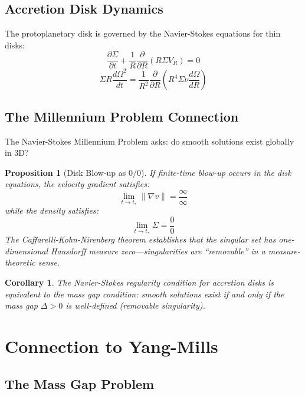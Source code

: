 \documentclass[12pt]{article}
\newtheorem{corollary}[theorem]{Corollary}
\newtheorem{proposition}[theorem]{Proposition}
\begin{document}
\subsection{Accretion Disk Dynamics}

The protoplanetary disk is governed by the Navier-Stokes equations for thin disks:
\begin{equation}
\frac{\partial \Sigma}{\partial t} + \frac{1}{R}\frac{\partial}{\partial R}(R \Sigma V_R) = 0
\end{equation}
\begin{equation}
\Sigma R \frac{d\Omega^2}{dt} = \frac{1}{R^2}\frac{\partial}{\partial R}\left(R^4 \Sigma \nu \frac{d\Omega}{dR}\right)
\end{equation}

\subsection{The Millennium Problem Connection}

The Navier-Stokes Millennium Problem asks: do smooth solutions exist globally in 3D?

\begin{proposition}[Disk Blow-up as $0/0$]
If finite-time blow-up occurs in the disk equations, the velocity gradient satisfies:
\begin{equation}
\lim_{t \to t_*} \|\nabla v\| = \frac{\infty}{\infty}
\end{equation}
while the density satisfies:
\begin{equation}
\lim_{t \to t_*} \Sigma = \frac{0}{0}
\end{equation}
The Caffarelli-Kohn-Nirenberg theorem establishes that the singular set has one-dimensional Hausdorff measure zero---singularities are ``removable'' in a measure-theoretic sense.
\end{proposition}

\begin{corollary}
The Navier-Stokes regularity condition for accretion disks is equivalent to the mass gap condition: smooth solutions exist if and only if the mass gap $\Delta > 0$ is well-defined (removable singularity).
\end{corollary}

\section{Connection to Yang-Mills}

\subsection{The Mass Gap Problem}
\end{document}
